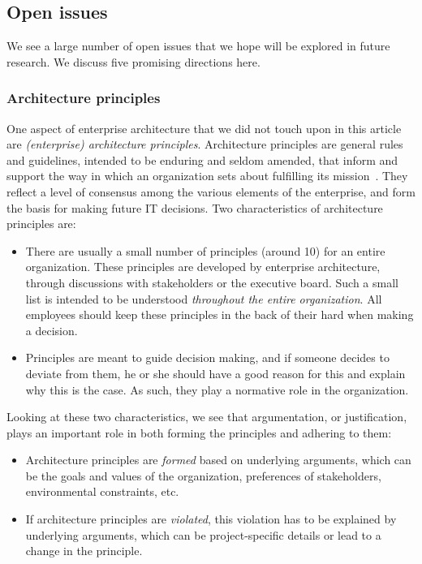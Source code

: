 \subsection{Open issues}
\label{sect:goalmodeling:openissues}

We see a large number of open issues that we hope will be explored in future research. We discuss five promising directions here.

\subsubsection*{Architecture principles} 
One aspect of enterprise architecture that we did not touch upon in this article are \emph{(enterprise) architecture principles}. Architecture principles are general rules and guidelines, intended to be enduring and seldom amended, that inform and support the way in which an organization sets about fulfilling its mission~\cite{Lankhorst2005,OptLand2007a,OG2009}. They reflect a level of consensus among the various elements of the enterprise, and form the basis for making future IT decisions. Two characteristics of architecture principles are:
\begin{itemize}
\item There are usually a small number of principles (around 10) for an entire organization. These principles are developed by enterprise architecture, through discussions with stakeholders or the executive board. Such a small list is intended to be understood \emph{throughout the entire organization}. All employees should keep these principles in the back of their hard when making a decision.
\item Principles are meant to guide decision making, and if someone decides to deviate from them, he or she should have a good reason for this and explain why this is the case. As such, they play a normative role in the organization.
\end{itemize}

Looking at these two characteristics, we see that argumentation, or justification, plays an important role in both forming the principles and adhering to them:
\begin{itemize}
\item Architecture principles are \emph{formed} based on underlying arguments, which can be the goals and values of the organization, preferences of stakeholders, environmental constraints, etc.
\item If architecture principles are \emph{violated}, this violation has to be explained by underlying arguments, which can be project-specific details or lead to a change in the principle.
\end{itemize}

